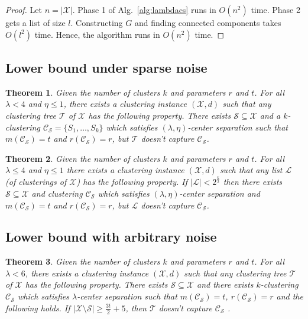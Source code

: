\documentclass[letterpaper,12pt,titlepage,oneside,final]{book}
\newtheorem{theorem}{Theorem}
\newcommand{\mc}{\mathcal}
\begin{document}
\begin{proof}
Let $n = |\mc X|$. Phase 1 of Alg.~\ref{alg:lambdacs} runs in $O(n^2)$ time. Phase 2 gets a list of size $l$. Constructing $G$ and finding connected components takes $O(l^2)$ time. Hence, the algorithm runs in $O(n^2)$ time.
\end{proof}


\subsection{Lower bound under sparse noise}
\label{section:lambdaLowerBoundSparse}
\begin{theorem}
\label{thm:noalglambdacs}
Given the number of clusters $k$ and parameters $r$ and $t$. For all $\lambda < 4$ and $\eta \le 1$, there exists a clustering instance $(\mc X , d)$ such that any clustering tree $\mc T$ of $\mc X$ has the following property. There exists $\mc S \subseteq \mc X$ and a $k$-clustering $\mc C_{\mc S} = \{S_1, \ldots, S_k\}$ which satisfies $(\lambda, \eta)$-center separation such that $m(\mc C_{\mc S}) = t$ and $r(\mc C_{\mc S}) = r$, but $\mc T$ doesn't capture $\mc C_{\mc S}$.
\end{theorem}

\begin{theorem}
\label{thm:nolistlambdacs}
Given the number of clusters $k$ and parameters $r$ and $t$. For all $\lambda \le 4$ and $\eta \le 1$ there exists a clustering instance $(\mc X, d)$ such that any list $\mc L$ (of clusterings of $\mc X$) has  the following property. If $|\mc L| < 2^{\frac{k}{2}}$ then there exists $\mc S \subseteq \mc X$ and clustering $\mc C_{\mc S}$ which satisfies $(\lambda, \eta)$-center separation and $ m(\mc C_{\mc S}) = t$ and $r(\mc C_{\mc S}) = r$, but $\mc L$ doesn't capture $\mc C_{\mc S}$.
\end{theorem}


\subsection{Lower bound with arbitrary noise}
\label{section:lambdaLowerBoundArbitrary}

\begin{theorem}
\label{thm:nosparselambdaalg}
Given the number of clusters $k$ and parameters $r$ and $t$. For all $\lambda < 6$, there exists a clustering instance $(\mc X , d)$ such that any clustering tree $\mc T$ of $\mc X$ has the following property. There exists $\mc S \subseteq \mc X$ and there exists $k$-clustering $\mc C_{\mc S}$ which satisfies $\lambda$-center separation such that $m(\mc C_{\mc S}) = t$, $r(\mc C_{\mc S}) = r$ and the following holds. If $|\mc X\setminus \mc S|\ge \frac{3t}{2}+5$, then $\mc T$ doesn't capture $\mc C_{\mc S}$ .
\end{theorem}
\end{document}
